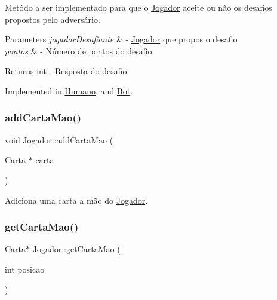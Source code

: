 Metódo a ser implementado para que o \mbox{\hyperlink{class_jogador}{Jogador}} aceite ou não os desafios propostos pelo adversário. 


\begin{DoxyParams}{Parameters}
{\em jogador\+Desafiante} & -\/ \mbox{\hyperlink{class_jogador}{Jogador}} que propos o desafio \\
\hline
{\em pontos} & -\/ Número de pontos do desafio \\
\hline
\end{DoxyParams}
\begin{DoxyReturn}{Returns}
int -\/ Resposta do desafio 
\end{DoxyReturn}


Implemented in \mbox{\hyperlink{class_humano_aa1cd4b8c801b73190ad1472f6fc860b1}{Humano}}, and \mbox{\hyperlink{class_bot_a203bfaaa13441296a94dd157fc253631}{Bot}}.

\mbox{\label{class_jogador_a01b6af5be0bb3789d1450f8a8f0e99d4}} 
\subsubsection{\texorpdfstring{addCartaMao()}{addCartaMao()}}
{\footnotesize\ttfamily void Jogador\+::add\+Carta\+Mao (\begin{DoxyParamCaption}\item[{\mbox{\hyperlink{class_carta}{Carta}} $\ast$}]{carta }\end{DoxyParamCaption})}



Adiciona uma carta a mão do \mbox{\hyperlink{class_jogador}{Jogador}}. 

\mbox{\label{class_jogador_a5b275f62c069fced9f4e2bb4f575c8c4}} 
\subsubsection{\texorpdfstring{getCartaMao()}{getCartaMao()}}
{\footnotesize\ttfamily \mbox{\hyperlink{class_carta}{Carta}}$\ast$ Jogador\+::get\+Carta\+Mao (\begin{DoxyParamCaption}\item[{int}]{posicao }\end{DoxyParamCaption})}



